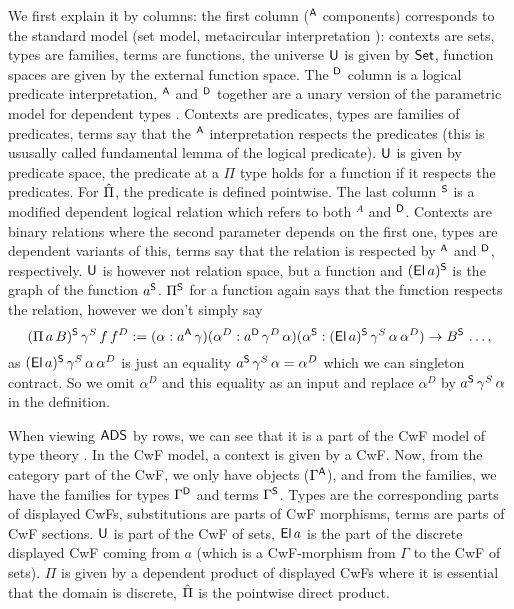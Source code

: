 \documentclass[a4paper,UKenglish,cleveref, autoref]{lipics-v2019}
\begin{document}
We first explain it by columns: the first column ($^\A$ components)
corresponds to the standard model (set model, metacircular
interpretation \cite{ttintt}): contexts are sets, types are families,
terms are functions, the universe $\U$ is given by $\Set$, function
spaces are given by the external function space. The $^\D$ column is a
logical predicate interpretation, $^\A$ and $^\D$ together are a unary
version of the parametric model for dependent types
\cite{10.1145/2535838.2535852}. Contexts are predicates, types are
families of predicates, terms say that the $^\A$ interpretation
respects the predicates (this is ususally called fundamental lemma of
the logical predicate). $\U$ is given by predicate space, the
predicate at a $\Pi$ type holds for a function if it respects the
predicates. For $\Pim$, the predicate is defined pointwise. The last
column $^\S$ is a modified dependent logical relation which refers to
both $^A$ and $^\D$. Contexts are binary relations where the second
parameter depends on the first one, types are dependent variants of
this, terms say that the relation is respected by $^\A$ and $^\D$,
respectively. $\U$ is however not relation space, but a function and
$(\El\,a)^\S$ is the graph of the function $a^\S$. $\Pi^\S$ for a
function again says that the function respects the relation, however
we don't simply say
\[
  (\Pi\,a\,B)^\S\,\gamma^S\,f\,f^D := (\alpha:a^\A\,\gamma)(\alpha^D:a^\D\,\gamma^D\,\alpha)(\alpha^\S:(\El\,a)^\S\,\gamma^S\,\alpha\,\alpha^D)\ra B^\S\,\dots,
\]
as $(\El\,a)^\S\,\gamma^S\,\alpha\,\alpha^D$ is just an equality
$a^\S\,\gamma^S\,\alpha = \alpha^D$ which we can singleton
contract. So we omit $\alpha^D$ and this equality as an input and
replace $\alpha^D$ by $a^\S\,\gamma^S\,\alpha$ in the definition.

When viewing $\ADS$ by rows, we can see that it is a part of the CwF
model of type theory \cite[Section
7.4]{Kaposi:2019:CQI:3302515.3290315}. In the CwF model, a context is
given by a CwF. Now, from the category part of the CwF, we only have
objects ($\Gamma^\A$), and from the families, we have the families for
types $\Gamma^\D$ and terms $\Gamma^\S$. Types are the corresponding
parts of displayed CwFs, substitutions are parts of CwF morphisms,
terms are parts of CwF sections. $\U$ is part of the CwF of sets,
$\El\,a$ is the part of the discrete displayed CwF coming from $a$
(which is a CwF-morphism from $\Gamma$ to the CwF of sets). $\Pi$ is
given by a dependent product of displayed CwFs where it is essential
that the domain is discrete, $\Pim$ is the pointwise direct product.
\end{document}
